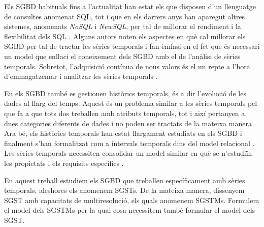 Els \gls{SGBD} habituals fins a l'actualitat han estat els que
disposen d'un llenguatge de consultes anomenat \gls{SQL}, tot i que en
els darrers anys han aparegut altres sistemes, anomenats \emph{NoSQL}
i \emph{NewSQL}, per tal de millorar el rendiment i la flexibilitat
dels
\gls{SQL} \parencite{atzeni13:relational_model_dead,stonebraker10,stonebraker09:scidb,zhang11}. Alguns
autors \parencite{dreyer94,schmidt95,stonebraker09:scidb,zhang11}
noten els aspectes en què cal millorar els \gls{SGBD} per tal de
tractar les sèries temporals i fan èmfasi en el fet que és necessari
un model que enllaci el coneixement dels \gls{SGBD} amb el de
l'anàlisi de sèries temporals. Sobretot, l'adquisició contínua de nous valors és
el un repte a l'hora d'emmagatzemar i analitzar les sèries
temporals \parencite{keogh97}.




En els \gls{SGBD} també es gestionen històrics temporals, és a dir
l'evolució de les dades al llarg del temps. Aquest és un problema
similar a les sèries temporals pel que fa a que tots dos treballen amb
atributs temporals, tot i així pertanyen a dues categories diferents
de dades i no poden ser tractats de la mateixa
manera \parencite{assfalg08:thesis,schmidt95}.  Ara bé, els històrics
temporals han estat llargament estudiats en els \gls{SGBD} i finalment
s'han formalitzat com a intervals temporals dins del model
relacional \parencite{date02:_tempor_data_relat_model}.  Les sèries
temporals necessiten consolidar un model similar en què se n'estudiïn
les propietats i els requisits
específics \parencite{dreyer94,segev87:sigmod}.




 En aquest treball estudiem els \gls{SGBD} que treballen
específicament amb sèries temporals, aleshores els anomenem
\glspl{SGST}. De la mateixa manera, dissenyem \gls{SGST} amb
capacitats de multiresolució, els quals anomenem
\glspl{SGSTM}. Formulem el model dels \glspl{SGSTM} per la qual cosa
necessitem també formular el model dels \gls{SGST}.









